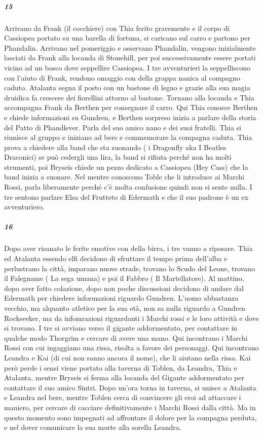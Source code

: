 \documentclass{article}
\begin{document}
    \subparagraph{15}
    Arrivano da Frank (il cocchiere) con Thia ferito gravemente e il corpo di Cassiopea portato su una barella di fortuna, si caricano sul carro e partono per Phandalin. Arrivano nel pomeriggio e osservano Phandalin, vengono inizialmente lasciati da Frank alla locanda di Stonehill, per poi successivamente essere portati vicino ad un bosco dove seppellire Cassiopea. I tre avventurieri la seppelliscono con l'aiuto di Frank, rendono omaggio con della grappa nanica al compagno caduto. Atalanta segna il posto con un bastone di legno e grazie alla sua magia druidica fa crescere dei fiorellini attorno al bastone. Tornano alla locanda e Thia accompagna Frank da Berthen per consegnare il carro. Qui Thia conosce Berthen e chiede informazioni su Gundren, e Berthen sorpreso inizia a parlare della storia del Patto di Phandlever. Parla del suo amico nano e dei suoi fratelli. Thia si riunisce al gruppo e iniziano ad bere e commemorare la compagna caduta. Thia prova a chiedere alla band che sta suonando ( i Dragonfly aka I Beatles Draconici) se può cedergli una lira, la band si rifiuta perché non ha molti strumenti, poi Bryseis chiede un pezzo dedicato a Cassiopea (Hey Cass) che la band inizia a suonare. Nel mentre conoscono Toble che li introduce ai Marchi Rossi, parla liberamente perché c'è molta confusione quindi non si sente nulla. I tre sentono parlare Elsa del Frutteto di Edermath e che il suo padrone è un ex avventuriero. 
    \subparagraph{16}
    Dopo aver risanato le ferite emotive con della birra, i tre vanno a riposare. Thia ed Atalanta essendo elfi decidono di sfruttare il tempo prima dell'alba e perlustrano la città, imparano nuove strade, trovano lo Scudo del Leone, trovano il Falegname ( La sega umana)  e poi il Fabbro ( Il Martellatore). Al mattino, dopo aver fatto colazione, dopo non poche discussioni decidono di andare dal Edermath per chiedere informazioni riguardo Gundren. L'uomo abbastanza vecchio, ma alquanto atletico per la sua età,  non sa nulla riguardo a  Gundren Rockseeker, ma da infomrazioni riguardanti i Marchi rossi e le loro attività e dove si trovano. I tre si avviano verso il gigante addormentato, per contattare in qualche modo Thorgrim e cercare di avere una mano. Qui incontrano i Marchi Rossi con cui ingaggiano una rissa, risolta a favore dei personaggi. Qui incontrano Leandra e Kai (di cui non sanno ancora il nome), che li aiutano nella rissa. Kai però perde  i sensi viene portato alla taverna di Toblen, da Leandra, Thia e Atalanta, mentre Bryseis si ferma alla locanda del Gigante addormentato per contattare il suo amico Sintri.  Dopo un'ora torna in taverna, si unisce a Atalanta e Leandra nel bere, mentre Toblen cerca di convincere gli eroi ad attaccare i maniero, per cercare di cacciare definitivamente i Marchi Rossi dalla città. Ma in questo momento sono impegnati ad affrontare il dolore per la compagna perduta, e nel dover comunicare la sua morte alla sorella Leandra.
   
\end{document}
